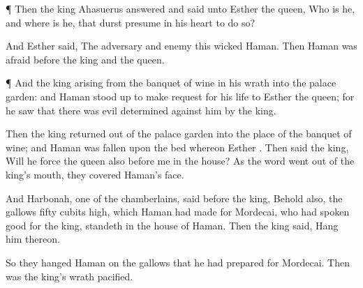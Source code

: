 {\par }{\PP {}¶ Then the
king
Ahasuerus
answered and
said unto
Esther the
queen, Who is he, and where is he, that durst
presume in his
heart to
do so?

And
Esther
said, The
adversary and
enemy
{} this
wicked
Haman. Then
Haman was
afraid
before the
king and the
queen.


\par }{\PP {}¶ And the
king
arising from the
banquet of
wine in his
wrath
{} into the
palace
garden: and
Haman stood
up to make
request for his
life to
Esther the
queen; for he
saw that there was
evil
determined against him by the
king.

Then the
king
returned out of the
palace
garden into the
place of the
banquet of
wine; and
Haman was
fallen upon the
bed whereon
Esther
{}. Then
said the
king, Will he
force the
queen also before me in the
house? As the
word went
out of the
king’s
mouth, they
covered
Haman’s
face.

And
Harbonah,
one of the
chamberlains,
said
before the
king, Behold also, the
gallows
fifty
cubits
high, which
Haman had
made for
Mordecai, who had
spoken
good for the
king,
standeth in the
house of
Haman. Then the
king
said,
Hang him thereon.

So they
hanged
Haman on the
gallows that he had
prepared for
Mordecai. Then was the
king’s
wrath
pacified.




\par }
